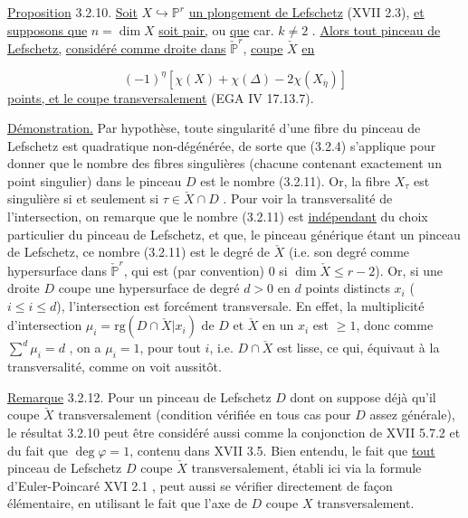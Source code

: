 \underline{Proposition} 3.2.10. \underline{Soit} $X \hookrightarrow \mathbb{P}^{r}$ \underline{un plongement de Lefschetz} (XVII 2.3), \underline{et supposons que} $n = \dim X$ \underline{soit pair,} ou \underline{que} car. $k \neq 2$ . \underline{Alors tout pinceau de Lefschetz,} \underline{considéré comme droite dans} $\check{\mathbb{P}}^{r}$, \underline{coupe} $\check{X}$ \underline{en}

\begin{equation}\tag{3.2.11}
(-1)^{\eta} [ \chi(X) + \chi(\Delta) - 2 \chi (X_{\overline{\eta}})]
\end{equation}
\underline{points, et le coupe transversalement} (EGA IV 17.13.7).

\underline{Démonstration.} Par hypothèse, toute singularité d'une fibre du pinceau de Lefschetz est quadratique non-dégénérée, de sorte que (3.2.4) s'applique pour donner que le nombre des fibres singulières (chacune contenant exactement un point singulier) dans le pinceau $D$ est le nombre (3.2.11). Or, la fibre $X_{\tau}$ est singulière si et seulement si $\tau \in \check{X} \cap D$ . Pour voir la transversalité de l'intersection, on remarque que le nombre (3.2.11) est \underline{indépendant} du choix particulier du pinceau de Lefschetz, et que, le pinceau générique étant un pinceau de Lefschetz, ce nombre (3.2.11) est le degré de $\check{X}$ (i.e. son degré comme hypersurface dans $\check{\mathbb{P}}^{r}$, qui est (par convention) $0$ si $\dim \check{X} \leq r-2$). Or, si une droite $D$ coupe une hypersurface de degré $d > 0$ en $d$ points distincts $x_{i}$ ($i \leq i \leq d$), l'intersection est forcément transversale. En effet, la multiplicité d'intersection $\mu_{i} = \mathrm{rg}(D \cap \check{X}|x_{i})$ de $D$ et $\check{X}$ en un $x_{i}$ est $\geq 1$, donc comme $\sum\limits^{d} \mu_{i} = d$ , on a $\mu_{i} = 1$, pour tout $i$, i.e. $D \cap \check{X}$ est lisse, ce qui, équivaut à la transversalité, comme on voit aussitôt.



\underline{Remarque} 3.2.12. Pour un pinceau de Lefschetz $D$ dont on suppose déjà qu'il coupe $\check{X}$ transversalement (condition vérifiée en tous cas pour $D$ assez générale), le résultat 3.2.10 peut être considéré aussi comme la conjonction de XVII 5.7.2 et du fait que $\deg \varphi = 1$, contenu dans XVII 3.5. Bien entendu, le fait que \underline{tout} pinceau de Lefschetz $D$ coupe $\check{X}$ transversalement, établi ici via la formule d'Euler-Poincaré XVI 2.1 , peut aussi se vérifier directement de façon élémentaire, en utilisant le fait que l'axe de $D$ coupe $X$ transversalement.


